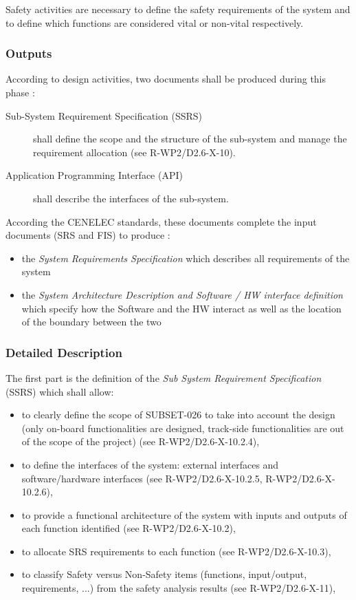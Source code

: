 Safety activities are necessary to define the safety requirements of the system and to define which functions are considered vital or non-vital respectively.

\subsubsection{Outputs}
\label{sec:sys-ana-outputs}

According to  design activities, two documents shall be produced during this phase :

\begin{description}
\item[Sub-System Requirement Specification (SSRS)] shall define the scope and the structure of the sub-system and  manage the requirement allocation (see R-WP2/D2.6-X-10).
\item[Application Programming Interface (API)] shall describe the interfaces of the sub-system.
\end{description}


According the CENELEC standards, these documents complete the input documents (SRS and FIS) to produce :
\begin{itemize}
\item the \emph{System  Requirements Specification} which describes all requirements of the system
\item the \emph{System Architecture Description
and Software / HW interface definition } which specify how the Software and the HW interact
as well as the location of the boundary between the two
\end{itemize}

\subsubsection{Detailed Description}
\label{sec:sys-ana-descr}

The first part is the definition of the  \emph{Sub System Requirement Specification} (SSRS) which shall allow:
\begin{itemize}
\item to clearly define the scope of SUBSET-026 to take into account the design (only on-board functionalities are designed, track-side functionalities are out of the scope of the project) (see R-WP2/D2.6-X-10.2.4),
\item to define the interfaces of the system: external interfaces and software/hardware interfaces (see R-WP2/D2.6-X-10.2.5, R-WP2/D2.6-X-10.2.6),
\item to provide a functional architecture of the system with inputs and outputs of each function identified (see R-WP2/D2.6-X-10.2),
\item to allocate SRS requirements to each function (see R-WP2/D2.6-X-10.3),
\item to classify Safety versus Non-Safety items (functions, input/output, requirements, ...) from the safety analysis results (see R-WP2/D2.6-X-11),
\end{itemize}

